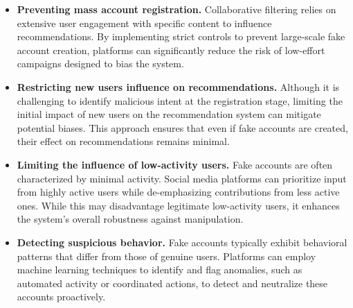 \documentclass[10pt,twocolumn,twoside,a4paper]{article} %
\begin{document}
\begin{itemize}
    \item \textbf{Preventing mass account registration.} Collaborative filtering relies on extensive user engagement with specific content to influence recommendations. By implementing strict controls to prevent large-scale fake account creation, platforms can significantly reduce the risk of low-effort campaigns designed to bias the system.
    \item \textbf{Restricting new users influence on recommendations.} Although it is challenging to identify malicious intent at the registration stage, limiting the initial impact of new users on the recommendation system can mitigate potential biases. This approach ensures that even if fake accounts are created, their effect on recommendations remains minimal.
    \item \textbf{Limiting the influence of low-activity users.} Fake accounts are often characterized by minimal activity. Social media platforms can prioritize input from highly active users while de-emphasizing contributions from less active ones. While this may disadvantage legitimate low-activity users, it enhances the system's overall robustness against manipulation.
    \item \textbf{Detecting suspicious behavior.} Fake accounts typically exhibit behavioral patterns that differ from those of genuine users. Platforms can employ machine learning techniques to identify and flag anomalies, such as automated activity or coordinated actions, to detect and neutralize these accounts proactively.
\end{itemize}
\end{document}
